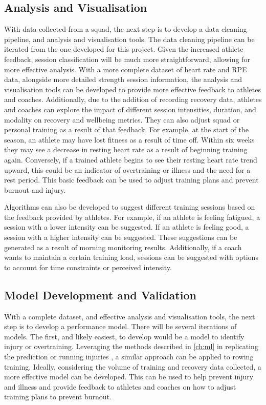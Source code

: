 \subsection{Analysis and Visualisation}
With data collected from a squad, the next step is to develop a data cleaning pipeline, and analysis and visualisation tools. The data cleaning pipeline can be iterated from the one developed for this project. Given the increased athlete feedback, session classification will be much more straightforward, allowing for more effective analysis. With a more complete dataset of heart rate and RPE data, alongside more detailed strength session information, the analysis and visualisation tools can be developed to provide more effective feedback to athletes and coaches. Additionally, due to the addition of recording recovery data, athletes and coaches can explore the impact of different session intensities, duration, and modality on recovery and wellbeing metrics. They can also adjust squad or personal training as a result of that feedback. For example, at the start of the season, an athlete may have lost fitness as a result of time off. Within six weeks they may see a decrease in resting heart rate as a result of beginning training again. Conversely, if a trained athlete begins to see their resting heart rate trend upward, this could be an indicator of overtraining or illness and the need for a rest period. This basic feedback can be used to adjust training plans and prevent burnout and injury.

Algorithms can also be developed to suggest different training sessions based on the feedback provided by athletes. For example, if an athlete is feeling fatigued, a session with a lower intensity can be suggested. If an athlete is feeling good, a session with a higher intensity can be suggested. These suggestions can be generated as a result of morning monitoring results. Additionally, if a coach wants to maintain a certain training load, sessions can be suggested with options to account for time constraints or perceived intensity.

\subsection{Model Development and Validation}
With a complete dataset, and effective analysis and visualisation tools, the next step is to develop a performance model. There will be several iterations of models. The first, and likely easiest, to develop would be a model to identify injury or overtraining. Leveraging the methods described in \autoref{ch:ml} in replicating the prediction or running injuries \cite{Lovdal2021}, a similar approach can be applied to rowing training. Ideally, considering the volume of training and recovery data collected, a more effective model can be developed. This can be used to help prevent injury and illness and provide feedback to athletes and coaches on how to adjust training plans to prevent burnout.

